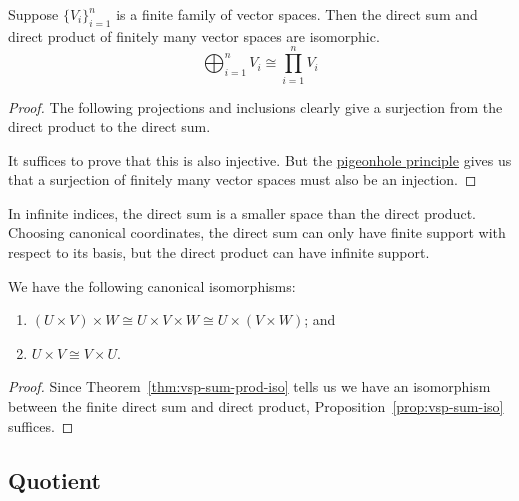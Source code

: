 \begin{theorem}\label{thm:vsp-sum-prod-iso}
    Suppose \({\{V_i\}}_{i=1}^n\) is a finite family of vector spaces.
    Then the direct sum and direct product of finitely many vector spaces are isomorphic.
    \begin{equation*}
        \bigoplus_{i=1}^n V_i \cong \prod_{i=1}^n V_i
    \end{equation*}
\end{theorem}
\begin{proof}
    The following projections and inclusions clearly give a surjection
    from the direct product to the direct sum.
    \begin{center}
    \end{center}
    It suffices to prove that this is also injective.
    But the \hyperref[thm:pigeonhole]{pigeonhole principle}
    gives us that a surjection of finitely many vector spaces
    must also be an injection.
\end{proof}
\begin{remark}
    In infinite indices,
    the direct sum is a smaller space than the direct product.
    Choosing canonical coordinates,
    the direct sum can only have finite support with respect to its basis,
    but the direct product can have infinite support.
\end{remark}

\begin{proposition}
    We have the following canonical isomorphisms:
    \begin{enumerate}[label={(\alph*)}, itemsep=0mm]
        \item \((U \times V) \times W \cong U \times V \times W \cong U \times (V \times W)\); and
        \item \(U \times V \cong V \times U\).
    \end{enumerate}
\end{proposition}
\begin{proof}
    Since Theorem~\ref{thm:vsp-sum-prod-iso} tells us we have an isomorphism
    between the finite direct sum and direct product,
    Proposition~\ref{prop:vsp-sum-iso} suffices.
\end{proof}


\subsection*{Quotient}

